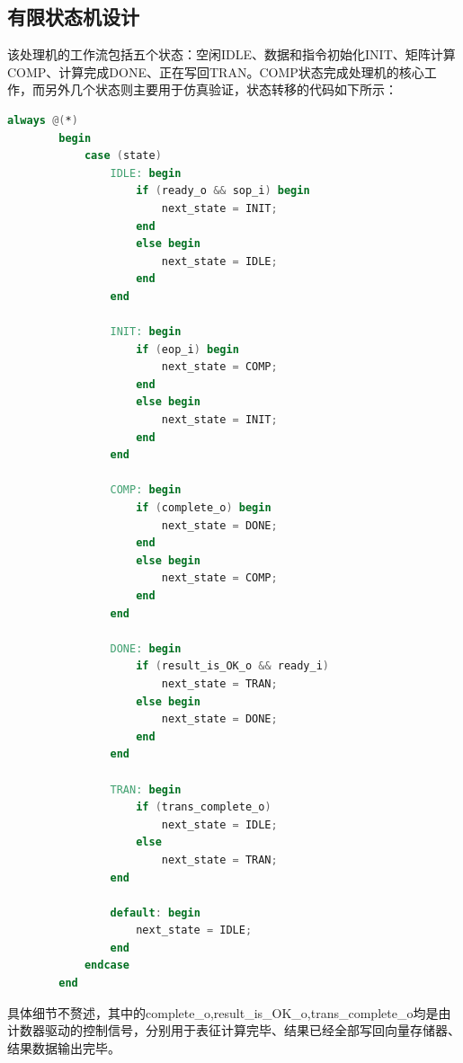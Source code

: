 \documentclass{article}
\begin{document}
    \subsection{有限状态机设计}
    该处理机的工作流包括五个状态：空闲IDLE、数据和指令初始化INIT、矩阵计算COMP、计算完成DONE、正在写回TRAN。COMP状态完成处理机的核心工作，而另外几个状态则主要用于仿真验证，状态转移的代码如下所示：
    \begin{lstlisting}[language=Verilog]
        always @(*)
        begin
            case (state)
                IDLE: begin
                    if (ready_o && sop_i) begin
                        next_state = INIT;
                    end
                    else begin
                        next_state = IDLE;
                    end
                end

                INIT: begin
                    if (eop_i) begin
                        next_state = COMP;
                    end
                    else begin
                        next_state = INIT;
                    end
                end

                COMP: begin
                    if (complete_o) begin
                        next_state = DONE;
                    end
                    else begin
                        next_state = COMP;
                    end
                end

                DONE: begin
                    if (result_is_OK_o && ready_i)
                        next_state = TRAN;
                    else begin
                        next_state = DONE;
                    end
                end

                TRAN: begin
                    if (trans_complete_o)
                        next_state = IDLE;
                    else
                        next_state = TRAN;        
                end

                default: begin
                    next_state = IDLE;
                end
            endcase
        end
    \end{lstlisting}

    具体细节不赘述，其中的complete\_o,result\_is\_OK\_o,trans\_complete\_o均是由计数器驱动的控制信号，分别用于表征计算完毕、结果已经全部写回向量存储器、结果数据输出完毕。
\end{document}
